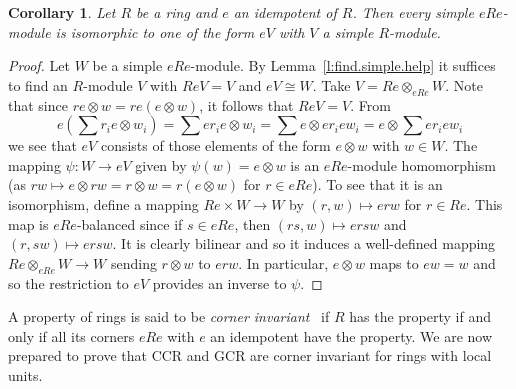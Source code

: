 \documentclass[11pt,reqno]{amsart}
\theoremstyle{plain}
\newtheorem{cor}[thm]{Corollary}
{\theoremstyle{definition}
\newtheorem{dfn}[thm]{Definition}}
{\theoremstyle{remark}
\newtheorem{ex}[thm]{Example}}
{\theoremstyle{remark}
\newtheorem*{ex*}{Example}}
{\theoremstyle{definition}
\newtheorem{note}[thm]{Note}}
{\theoremstyle{remark}
\newtheorem{remark}[thm]{Remark}}
\numberwithin{equation}{section}
\begin{document}
\begin{cor}\label{c:get.a.simple}
Let $R$ be a ring and $e$ an idempotent of $R$.  Then every simple $eRe$-module is isomorphic to one of the form $eV$ with $V$ a simple $R$-module.
\end{cor}
\begin{proof}
Let $W$ be a simple $eRe$-module.
By Lemma~\ref{l:find.simple.help} it suffices to find an $R$-module $V$ with $ReV=V$ and $eV\cong W$.  Take $V=Re\otimes_{eRe} W$. Note that
since $re\otimes w= re(e\otimes w)$, it follows that $ReV=V$.  From \[e\left(\sum r_ie\otimes w_i\right) = \sum er_ie\otimes w_i = \sum e\otimes er_iew_i = e\otimes \sum er_iew_i\] we see that $eV$ consists of those elements of the form $e\otimes w$ with $w\in W$.  The mapping $\psi\colon W\to eV$ given by $\psi(w)= e\otimes w$ is an $eRe$-module homomorphism (as $rw\mapsto e\otimes rw = r\otimes w = r(e\otimes w)$ for $r\in eRe$).  To see that it is an isomorphism, define a mapping $Re\times W\to W$ by $(r,w)\mapsto erw$ for $r\in Re$.  This map is $eRe$-balanced since if $s\in eRe$, then $(rs,w)\mapsto ersw$ and $(r,sw)\mapsto ersw$.  It is clearly bilinear and so it induces a well-defined mapping $Re\otimes_{eRe} W\to W$ sending $r\otimes w$ to $erw$.  In particular, $e\otimes w$ maps to $ew=w$ and so the restriction to $eV$ provides an inverse to $\psi$.
\end{proof}

A property of rings is said to be \emph{corner invariant}~\cite{SS16} if $R$ has the property if and only if all its corners $eRe$ with $e$ an idempotent have the property.  We are  now prepared to prove that CCR and GCR are corner invariant for rings with local units.
\end{document}

